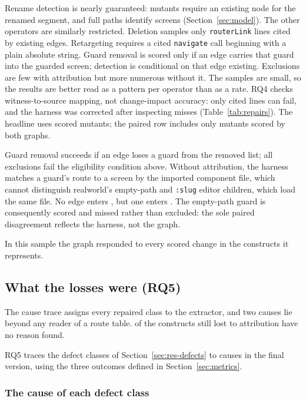 Rename detection is nearly guaranteed: mutants require an existing node for the renamed segment,
and full paths identify screens (Section~\ref{sec:model}). The other operators are similarly
restricted. Deletion samples only \texttt{routerLink} lines cited by existing edges. Retargeting
requires a cited \texttt{navigate} call beginning with a plain absolute string. Guard removal is
scored only if an edge carries that guard into the guarded screen; detection is conditional on that
edge existing. Exclusions are few with attribution but more numerous without it. The samples are small, so the results are better read as a pattern per operator than as a rate.
RQ4 checks witness-to-source mapping, not change-impact accuracy: only cited lines can fail, and
the harness was corrected after inspecting misses (Table~\ref{tab:repairs}). The headline uses
scored mutants; the paired row includes only mutants scored by both graphs.


Guard removal succeeds if an edge loses a guard from the removed list; all \MutExcludedGuard{}
exclusions fail the eligibility condition above. Without attribution, the harness matches a guard's route to a screen by the imported
component file, which cannot distinguish realworld's empty-path and \texttt{:slug} editor children, which
load the same file. No edge enters , but one enters . The
empty-path guard is consequently scored and missed rather than excluded: the sole paired
disagreement reflects the harness, not the graph.

In this sample the graph responded to every scored change in the constructs it represents.

\subsection{What the losses were (RQ5)}
\label{sec:res-round2}

The cause trace assigns every repaired class to the extractor, and two causes lie beyond any reader of a
route table. \AttrRemainingUnexplained{} of the \AttrRemaining{} constructs still lost to attribution have no
reason found.

RQ5 traces the defect classes of Section~\ref{sec:res-defects} to causes in the final version,
using the three outcomes defined in Section~\ref{sec:metrics}.

\subsubsection{The cause of each defect class}
\label{sec:res-losses}

